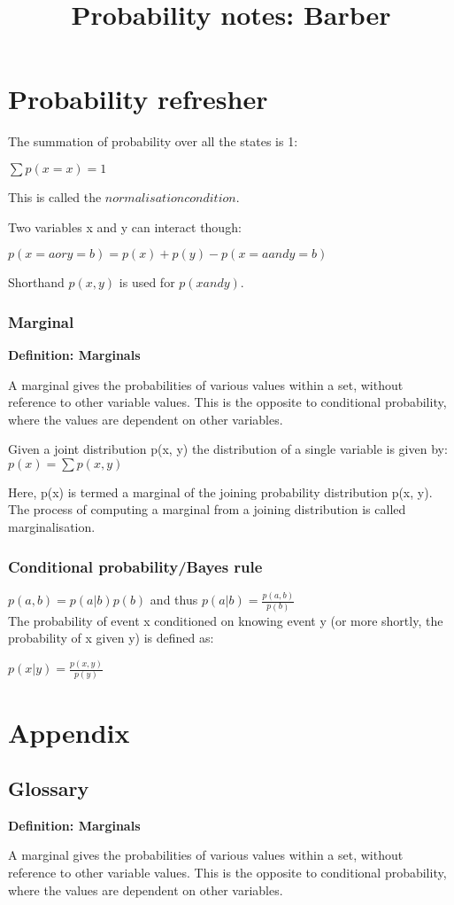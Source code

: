 \documentclass[11pt]{report}
\newcommand{\define}[2] {
  \textbf{Definition: #1}
  \begin{center} #2
\end{center}
}
\begin{document}
\title{Probability notes: Barber}
\maketitle

\chapter{Probability refresher}

The summation of probability over all the states is 1:

$\sum{p(x = x)} = 1$

This is called the $normalisation condition$.

Two variables x and y can interact though:

$p(x = a or y = b) = p(x) + p(y) - p(x = a and y = b)$

Shorthand $p(x, y)$ is used for $p(x and y)$.

\subsection*{Marginal}
\define{Marginals}{A marginal gives the probabilities of various values within a set, without reference to other variable values. This is the opposite to conditional probability, where the values are dependent on other variables.}

Given a joint distribution p(x, y) the distribution of a single variable is given by:
$p(x) = \sum{p(x, y)}$

Here, p(x) is termed a marginal of the joining probability distribution p(x, y). The process of computing a marginal from a joining distribution is called marginalisation.

\subsection*{Conditional probability/Bayes rule}
$p(a, b) = p(a|b)p(b)$ and thus $p(a | b) = \frac{p(a, b)}{p(b)}$ \\
The probability of event x conditioned on knowing event y (or more shortly, the probability of x given y) is defined as:

$p(x | y) = \frac{p(x, y)}{p(y)}$

\chapter{Appendix}

\section{Glossary}

\define{Marginals}{A marginal gives the probabilities of various values within a set, without reference to other variable values. This is the opposite to conditional probability, where the values are dependent on other variables.}
\end{document}
